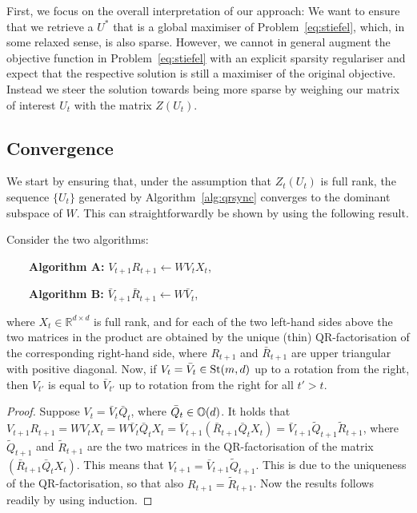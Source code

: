 \documentclass{article}
\begin{document}
First, we focus on the overall interpretation of our approach:
%
%
%
%
We want to ensure that we retrieve a $U^*$ that is a global maximiser of Problem~\eqref{eq:stiefel}, which, in some relaxed sense, is also sparse. However, we cannot in general augment the objective function in Problem~\eqref{eq:stiefel} with an explicit sparsity regulariser and expect that the respective solution is still a maximiser of the original objective. Instead we steer the solution towards being more sparse by weighing our  matrix of interest $U_t$ with the matrix $Z(U_t)$. 

\subsection{Convergence}
We start by ensuring that, under the assumption that $Z_t(U_t)$ is full rank, the sequence $\{U_t\}$ generated by Algorithm~\ref{alg:qrsync} converges to the dominant subspace of $W$. This can straightforwardly be shown by using the following result. 

\begin{lemma}\label{lem:101}
Consider the two algorithms:\par
$\qquad$\textbf{Algorithm A: } $V_{t+1}R_{t+1} \gets WV_tX_t$, \par
$\qquad$\textbf{Algorithm B: } $\bar V_{t+1}\bar R_{t+1} \gets  W\bar V_t$, \par
where $X_t \in \mathbb{R}^{d \times d}$ is full rank, and for each of the two left-hand sides above the two matrices in the product are obtained by the unique (thin) QR-factorisation of the corresponding right-hand side, where $R_{t+1}$ and $\bar{R}_{t+1}$  are upper triangular with positive diagonal. Now, if $V_t = \bar V_t \in \operatorname{St}(m,d)$ up to a rotation from the right, then $V_{t'}$ is equal to $\bar V_{t'}$ up to rotation from the right for all $t' > t$.
\end{lemma}

\begin{proof}
Suppose $V_t = \bar V_t \bar Q_t$, where $\bar Q_t \in \mathbb{O}(d)$. It holds that $V_{t+1}R_{t+1}  = WV_t X_t  = W \bar V_t \bar Q_t X_t = \bar V_{t+1} (\bar R_{t+1} \bar Q_t X_t) = \bar V_{t+1} \tilde{Q}_{t+1}\tilde{R}_{t+1}$,
where $\tilde{Q}_{t+1}$ and $\tilde{R}_{t+1}$ are the two matrices in the QR-factorisation of the matrix $(\bar R_{t+1} \bar Q_t X_t)$. This means that $V_{t+1} = \bar V_{t+1} \tilde{Q}_{t+1}$. This is due to the uniqueness of the QR-factorisation, so that also $R_{t+1} = \tilde{R}_{t+1}$. Now the results follows readily by using induction. 
\end{proof}
\end{document}
